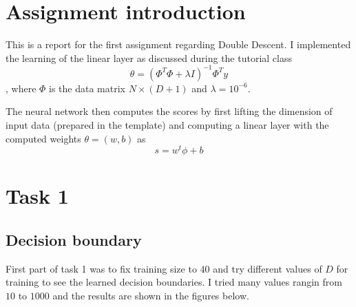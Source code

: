 \documentclass[a4paper,11pt]{article}
\begin{document}
\section{Assignment introduction}
This is a report for the first assignment regarding Double Descent.
I implemented the learning of the linear layer as discussed during the tutorial class
\[
    \theta = (\Phi^T \Phi + \lambda I)^{-1}\Phi^Ty
\]
, where $\Phi$ is the data matrix $N\times(D+1)$ and $\lambda = 10^{-6}$.

The neural network then computes the scores by first lifting the dimension of input data (prepared in the template) and computing a linear layer with the computed weights $\theta = (w, b)$ as
\[
    s = w^t \phi + b
\]

\section{Task 1}
\subsection{Decision boundary}
First part of task 1 was to fix training size to $40$ and try different values of $D$ for training to see the learned decision boundaries.
I tried many values rangin from $10$ to $1000$ and the results are shown in the figures below.
\end{document}
